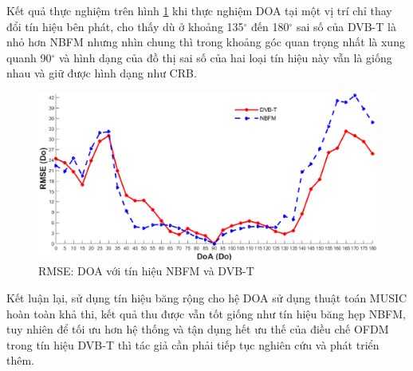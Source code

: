\newpage
Kết quả thực nghiệm trên hình \ref{fig:dvbt_3} khi thực nghiệm DOA tại một vị trí chỉ thay đổi tín hiệu bên phát, cho thấy dù ở khoảng 135$^{\circ}$ đến 180$^{\circ}$ sai số của DVB-T là nhỏ hơn NBFM nhưng nhìn chung thì trong khoảng góc quan trọng nhất là xung quanh 90$^{\circ}$ và hình dạng của đồ thị sai số của hai loại tín hiệu này vẫn là giống nhau và giữ được hình dạng như CRB.
\begin{figure} [!h]
	\centering
	\includegraphics[width=1\linewidth]{figures/dvbt_3.png}
	\caption{RMSE: DOA với tín hiệu NBFM và DVB-T}
	\label{fig:dvbt_3}
\end{figure}

Kết luận lại, sử dụng tín hiệu băng rộng cho hệ DOA sử dụng thuật toán MUSIC hoàn toàn khả thi, kết quả thu được vẫn tốt giống như tín hiệu băng hẹp NBFM, tuy nhiên để tối ưu hơn hệ thống và tận dụng hết ưu thế của điều chế OFDM trong tín hiệu DVB-T thì tác giả cần phải tiếp tục nghiên cứu và phát triển thêm.